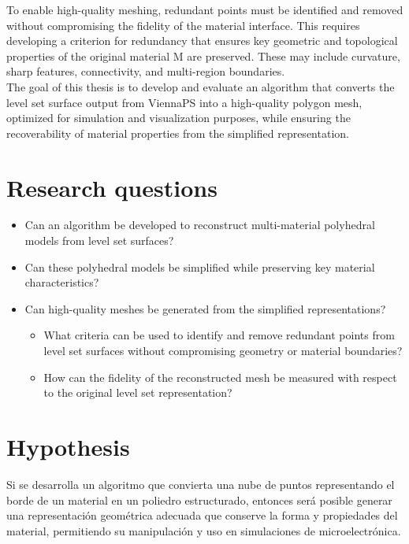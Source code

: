 \documentclass[submission]{eptcs}
\begin{document}
To enable high-quality meshing, redundant points must be identified and removed without compromising the fidelity of the material interface. This requires developing a criterion for redundancy that ensures key geometric and topological properties of the original material M are preserved. These may include curvature, sharp features, connectivity, and multi-region boundaries. \\

The goal of this thesis is to develop and evaluate an algorithm that converts the level set surface output from ViennaPS into a high-quality polygon mesh, optimized for simulation and visualization purposes, while ensuring the recoverability of material properties from the simplified representation.

\section{Research questions}

\begin{itemize}
    \item Can an algorithm be developed to reconstruct multi-material polyhedral models from level set surfaces?
    \item Can these polyhedral models be simplified while preserving key material characteristics?
    \item Can high-quality meshes be generated from the simplified representations?
        \begin{itemize}
    \item What criteria can be used to identify and remove redundant points from level set surfaces without compromising geometry or material boundaries?
    \item How can the fidelity of the reconstructed mesh be measured with respect to the original level set representation?
\end{itemize}
\end{itemize}


\section{Hypothesis}

Si se desarrolla un algoritmo que convierta una nube de puntos representando el borde de un material en un poliedro estructurado, entonces será posible generar una representación geométrica adecuada que conserve la forma y propiedades del material, permitiendo su manipulación y uso en simulaciones de microelectrónica.
\end{document}
